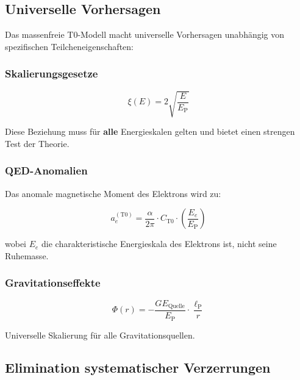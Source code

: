 \documentclass[12pt,a4paper]{article}
\newcommand{\lP}{\ell_{\text{P}}}
\newcommand{\EP}{E_{\text{P}}}
\newcommand{\xipar}{\xi}
\begin{document}
	\subsection{Universelle Vorhersagen}
	\label{subsec:universal_predictions}
	
	Das massenfreie T0-Modell macht universelle Vorhersagen unabhängig von spezifischen Teilcheneigenschaften:
	
	\subsubsection{Skalierungsgesetze}
	
	\begin{equation}
		\xipar(E) = 2\sqrt{\frac{E}{\EP}}
		\label{eq:universal_scaling}
	\end{equation}
	
	Diese Beziehung muss für \textbf{alle} Energieskalen gelten und bietet einen strengen Test der Theorie.
	
	\subsubsection{QED-Anomalien}
	
	Das anomale magnetische Moment des Elektrons wird zu:
	
	\begin{equation}
		a_e^{(\text{T0})} = \frac{\alpha}{2\pi} \cdot C_{\text{T0}} \cdot \left(\frac{E_e}{\EP}\right)
		\label{eq:qed_universal}
	\end{equation}
	
	wobei $E_e$ die charakteristische Energieskala des Elektrons ist, nicht seine Ruhemasse.
	
	\subsubsection{Gravitationseffekte}
	
	\begin{equation}
		\Phi(r) = -\frac{G E_{\text{Quelle}}}{\EP} \cdot \frac{\lP}{r}
		\label{eq:gravity_universal}
	\end{equation}
	
	Universelle Skalierung für alle Gravitationsquellen.
	
	\subsection{Elimination systematischer Verzerrungen}
	\label{subsec:bias_elimination}
	
\end{document}

